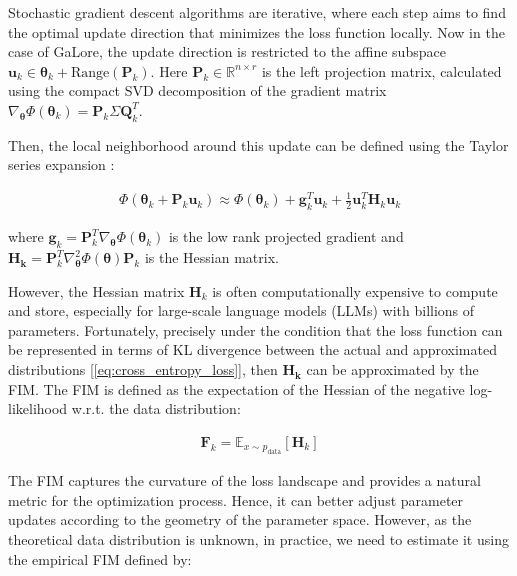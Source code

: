 Stochastic gradient descent algorithms are iterative, where each step aims to find the optimal update direction that minimizes the loss function locally. Now in the case of GaLore, the update direction is restricted to the affine subspace \(\mathbf{u}_{k} \in {\mathbf{\theta}_{k}} + \text{Range} \left(\mathbf{P}_{k}\right)\). Here \(\mathbf{P}_{k} \in \mathbb{R}^{n \times r}\) is the left projection matrix, calculated using the compact SVD decomposition of the gradient matrix \(\nabla_{\mathbf{\theta}} \Phi(\mathbf{\theta}_{k}) = \mathbf{P}_{k} \Sigma \mathbf{Q}_{k}^{T}\).

Then, the local neighborhood around this update can be defined using the Taylor series expansion \citep{lin2022randomized}:

\begin{eqnarray}
\Phi(\mathbf{\theta}_{k} + \mathbf{P}_{k} \mathbf{u}_{k}) \approx \Phi(\mathbf{\theta}_{k}) + \mathbf{g}_{k}^{T}\mathbf{u}_{k} + \frac{1}{2} \mathbf{u}_{k}^{T} \mathbf{H}_{k}  \mathbf{u}_{k}
\label{eq:taylor_series_expansion}
\end{eqnarray}

where \(\mathbf{g}_{k} = \mathbf{P}_{k}^{T}\nabla_{\mathbf{\theta}} \Phi(\mathbf{\theta}_{k})\) is the low rank projected gradient and \(\mathbf{H_{k}} = \mathbf{P}_{k}^{T}\nabla^2_{\mathbf{\theta}} \Phi(\mathbf{\theta}) \mathbf{P}_{k}\) is the Hessian matrix.

However, the Hessian matrix \(\mathbf{H}_{k}\) is often computationally expensive to compute and store, especially for large-scale language models (LLMs) with billions of parameters. Fortunately, precisely under the condition that the loss function can be represented in terms of KL divergence between the actual and approximated distributions [\ref{eq:cross_entropy_loss}], then \(\mathbf{H_{k}}\) can be approximated by the FIM. The FIM is defined as the expectation of the Hessian of the negative log-likelihood w.r.t. the data distribution:

\begin{eqnarray}
\mathbf{F}_{k} = \mathbb{E}_{x \sim p_{\text{data}}} \left[ \mathbf{H}_{k} \right]
\end{eqnarray}

The FIM captures the curvature of the loss landscape and provides a natural metric for the optimization process. Hence, it can better adjust parameter updates according to the geometry of the parameter space. However, as the theoretical data distribution is unknown, in practice, we need to estimate it using the empirical FIM \citep{martensNewPerspectiveNatural2014} defined by:

